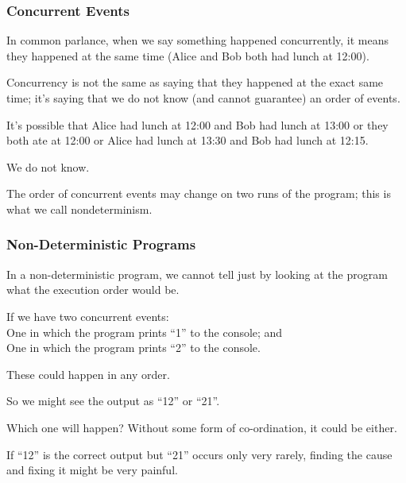\begin{frame}
\frametitle{Concurrent Events}

In common parlance, when we say something happened concurrently, it means they happened at the same time (Alice and Bob both had lunch at 12:00). 

Concurrency is not the same as saying that they happened at the exact same time; it's saying that we do not know (and cannot guarantee) an order of events. 

It's possible that Alice had lunch at 12:00 and Bob had lunch at 13:00 or they both ate at 12:00 or Alice had lunch at 13:30 and Bob had lunch at 12:15. 

We do not know. 

The order of concurrent events may change on two runs of the program; this is what we call \alert{nondeterminism}.

\end{frame}

\begin{frame}
\frametitle{Non-Deterministic Programs}

In a non-deterministic program, we cannot tell just by looking at the program what the execution order would be. 

If we have two concurrent events: \\
\quad One in which the program prints ``1'' to the console; and\\
\quad One in which the program prints ``2'' to the console.

These could happen in any order. 

So we might see the output as ``12'' or ``21''. 

Which one will happen? Without some form of co-ordination, it could be either. 

If ``12'' is the correct output but ``21'' occurs only very rarely, finding the cause and fixing it might be very painful.


\end{frame}


